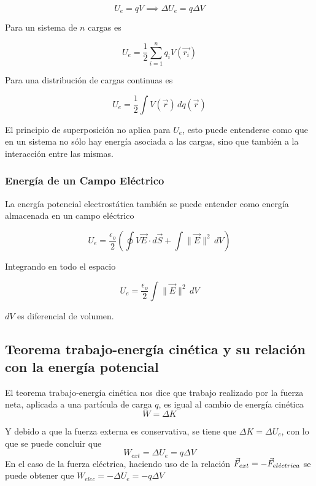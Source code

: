 \[U_e = qV \implies \Delta U_e = q \Delta V\]

Para un sistema de $n$ cargas es

\[U_e = \frac{1}{2}\sum_{i=1}^nq_iV(\Vec{r_i})\]

Para una distribución de cargas continuas es

\[U_e = \frac{1}{2}\int V(\Vec{r})\, dq(\Vec{r})\]

El principio de superposición no aplica para $U_e$, esto puede entenderse como que en un sistema no sólo hay energía asociada a las cargas, sino que también a la interacción entre las mismas.

\subsubsection{Energía de un Campo Eléctrico}

La energía potencial electrostática también se puede entender como energía almacenada en un campo eléctrico

\[U_e = \frac{\epsilon_o}{2}\left(
\oint V\Vec{E}\cdot d\Vec{S}
+\int \parallel\Vec{E}\parallel^2\, dV
\right)\]

Integrando en todo el espacio

\[U_e = \frac{\epsilon_o}{2}\int \parallel\Vec{E}\parallel^2\, dV\]

$dV$ es diferencial de volumen.

\subsection{Teorema trabajo-energía cinética y su relación con la energía potencial}

El teorema trabajo-energía cinética nos dice que trabajo realizado por la fuerza neta, aplicada a una partícula de carga $q$, es igual al cambio de energía cinética
\[W = \Delta K\]

Y debido a que la fuerza externa es conservativa, se tiene que $\Delta K = \Delta U_e$, con lo que se puede concluir que
\[W_{ext} = \Delta U_e = q \Delta V\]
En el caso de la fuerza eléctrica, haciendo uso de la relación $\Vec{F}_{ext} = -\Vec{F}_{el\Acute{e}ctrica}$ se puede obtener que $ W_{elec} = -\Delta U_e =-q\Delta V$

\newpage